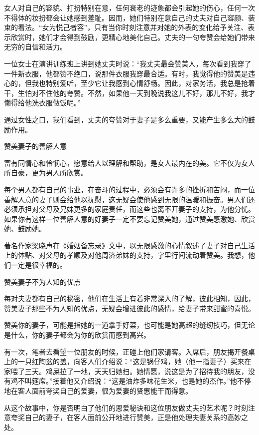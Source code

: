\documentclass[12pt,UTF8]{ctexbook}
\begin{document}
女人对自己的容貌、打扮特别在意，任何衰老的迹象都会引起她的伤心，任何一次不得体的妆扮都会让她感到羞耻。因而，她们特别在意自己的丈夫对自己容颜、装束的看法。“女为悦己者容”，只有当你时刻注意并对她的外表的变化给予关注、表示欣赏时，她们才会得到鼓励，更精心地美化自己。丈夫的一句夸赞会给她们带来无穷的自信和活力。

一位女士在演讲训练班上讲到她丈夫时说：“我丈夫最会赞美人，每次看到我穿了一件新衣服，他都赞不绝口，说那件衣服我穿最合适。有时，我觉得他的赞美是违心的，但我也特别爱听，至少它让我感到心情舒畅。因此，对家务活，我总是抢着干，生怕对不住他的夸赞。不然，如果他一天到晚说我这儿不好，那儿不好，我才懒得给他洗衣服做饭呢。”

通过女性之口，我们看到，丈夫的夸赞对于妻子是多么重要，又能产生多么大的鼓励作用。





赞美妻子的善解人意


富有同情心和怜悯心，愿意给人以理解和帮助，是女人最内在的美。它不仅为女人所自豪，更为男人所欣赏。

每个男人都有自己的事业，在奋斗的过程中，必须会有许多的挫折和苦闷，而一位善解人意的妻子则会给他以抚慰，这无疑会使他感到无限的温暖和振奋。男人们还必须承担对父母及兄妹更多的家庭责任，而这些也离不开妻子的支持，为他分忧。如果你有这样一位善解人意的好妻子一定不要忘记赞美她，通过赞美感激她、欣赏她、鼓励她。

著名作家梁晓声在《婚姻备忘录》文中，以无限感激的心情叙述了妻子对自己生活上的体贴、对父母的孝顺及对他周济弟妹的支持，字里行间流动着赞美。我想，他们一定是很幸福的。





赞美妻子不为人知的优点


每对夫妻都有自己的秘密，他们在生活上有着非常深入的了解，彼此相知，因此，赞美妻子那些不为人知的优点，无疑会增进彼此的感情，给妻子带来甜蜜的喜悦。

赞美你的妻子，可能是指她的一道拿手好菜，也可能是她高超的缝纫技巧，但无论是什么，你的妻子都会为你的欣赏而感到高兴。

有一次，笔者去看望一位朋友的时候，正碰上他们家请客。入席后，朋友揭开餐桌上的一只红陶盆的盖，向客人们介绍说：“这是锅仔鸡，她（他一指妻子）买来在家喂了三天。鸡屎拉了一地，天天归她扫。她情愿，说这是为了招待我的朋友，没有鸡不叫筵席。”接着他又介绍说：“这是油炸多味花生米，也是她的杰作。”他不停地在客人面前夸奖自己的爱妻，很为爱妻的贤惠能干而得意。

从这个故事中，你是否明白了他们的恩爱秘诀和这位朋友做丈夫的艺术呢？时刻注意夸奖自己的妻子，在客人面前公开地进行赞美，正是他处理夫妻关系的高妙之处。
\end{document}
